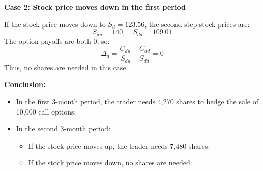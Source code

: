 \documentclass[12pt,letterpaper, onecolumn]{exam}
\begin{document}
\begin{solution}
\textbf{Case 2: Stock price moves down in the first period}

If the stock price moves down to \( S_d = 123.56 \), the second-step stock prices are:
\[
S_{du} = 140, \quad S_{dd} = 109.01
\]
The option payoffs are both 0, so:
\[
\Delta_d = \frac{C_{du} - C_{dd}}{S_{du} - S_{dd}} = 0
\]
Thus, no shares are needed in this case.

\textbf{Conclusion:}
\begin{itemize}
    \item In the first 3-month period, the trader needs 4,270 shares to hedge the sale of 10,000 call options.
    \item In the second 3-month period:
    \begin{itemize}
        \item If the stock price moves up, the trader needs 7,480 shares.
        \item If the stock price moves down, no shares are needed.
    \end{itemize}
\end{itemize}

\end{solution}
    
\end{document}
